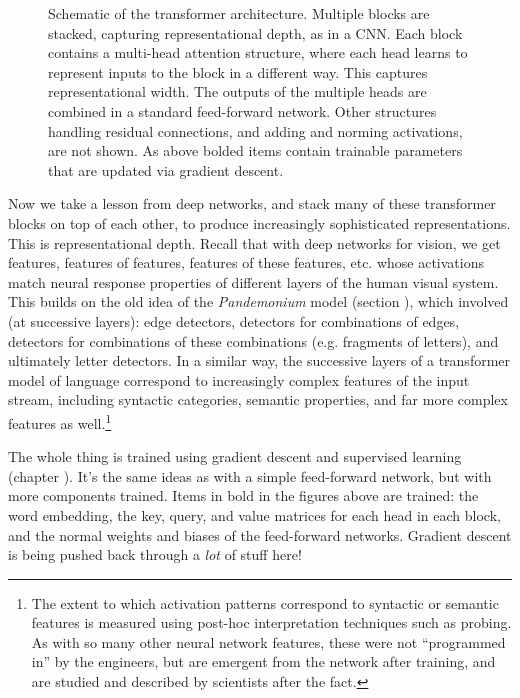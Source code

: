 \begin{figure}[h]
\caption[Jeff Yoshimi with consultation from Tim Meyer.]{Schematic of the transformer architecture. Multiple blocks are stacked, capturing representational depth, as in a CNN.  Each block contains a multi-head attention structure, where each head learns to represent inputs to the block in a different way. This captures representational width.  The outputs of the multiple heads are combined in a standard feed-forward network. Other structures handling residual connections, and adding and norming activations, are not shown. As above bolded items contain trainable parameters that are updated via gradient descent.}
\label{transformerArchitectureSchematic}
\end{figure}
 
Now we take a lesson from deep networks, and stack many of these transformer blocks on top of each other, to produce increasingly sophisticated representations. This is representational depth. Recall that with deep networks for vision, we get features, features of features, features of these features, etc. whose activations match neural response properties of different layers of the human visual system. This builds on the old idea of the \emph{Pandemonium} model (section ), which involved (at successive layers): edge detectors, detectors for combinations of edges, detectors for combinations of these combinations (e.g. fragments of letters), and ultimately letter detectors. In a similar way, the successive layers of a transformer model of language correspond to increasingly complex features of the input stream, including syntactic categories, semantic properties, and far more complex features as well.\footnote{The extent to which activation patterns correspond to syntactic or semantic features is measured using post-hoc interpretation techniques such as probing. As with so many other neural network features, these were not ``programmed in'' by the engineers, but are emergent from the network after training, and are studied and described by scientists after the fact.}

The whole thing is trained using gradient descent and supervised learning (chapter ). It's the same ideas as with a simple feed-forward network, but with more components trained. Items in bold in the figures above are trained: the word embedding, the key, query, and value matrices for each head in each block, and the normal weights and biases of the feed-forward networks.  Gradient descent is being pushed back through a \emph{lot} of stuff here!

